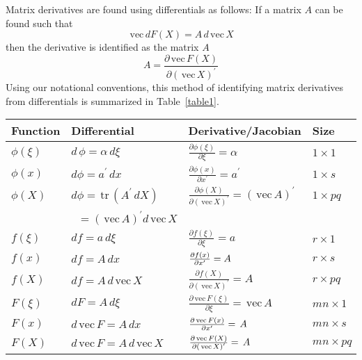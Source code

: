 \documentclass[12pt,thmsa,suthesis,verbatim]{report}
\begin{document}
Matrix derivatives are found using differentials as follows: If a matrix $A$
can be found such that 
\begin{equation}
\,\mathrm{vec}\,dF\left( X\right) =A\,d\,\mathrm{vec}\,X
\end{equation}
then the derivative is identified as the matrix $A$%
\begin{equation}
A=\frac{\partial \,\mathrm{vec}\,F\left( X\right) }{\partial \left( \,%
\mathrm{vec}\,X\right) ^{\prime }}
\end{equation}
Using our notational conventions, this method of identifying matrix
derivatives from differentials is summarized in Table~\ref{table1}\cite
{MagNeud88}.

\begin{tabular}[t]{llll}
\hline\hline
Function & Differential & Derivative/Jacobian & Size \\ \hline
$\phi \left( \xi \right) $ & $d\,\phi =\alpha \,d\xi $ & $\frac{\partial
\phi \left( \xi \right) }{\partial \xi }=\alpha $ & $1\times 1$ \\ 
$\phi \left( x\right) $ & $d\phi =a^{\prime }\,dx$ & $\frac{\partial \phi
\left( x\right) }{\partial x^{\prime }}=a^{\prime }$ & $1\times s$ \\ 
$\phi \left( X\right) $ & $d\phi =\,\mathrm{tr}\,\left( A^{\prime
}\,dX\right) $ & $\frac{\partial \phi \left( X\right) }{\partial \left( \,%
\mathrm{vec}\,X\right) ^{\prime }}=\left( \,\mathrm{vec}\,A\right) ^{\prime
} $ & $1\times pq$ \\ 
& $\;\;=\left( \,\mathrm{vec}\,A\right) ^{\prime }d\,\mathrm{vec}\,X$ &  & 
\\ 
$f\left( \xi \right) $ & $df=a\,d\xi $ & $\frac{\partial f\left( \xi \right) 
}{\partial \xi }=a$ & $r\times 1$ \\ 
$f\left( x\right) $ & $df=A\,dx$ & $\frac{\partial f\left( x\right) }{%
\partial x^{\prime }}=A$ & $r\times s$ \\ 
$f\left( X\right) $ & $df=A\,d\,\mathrm{vec}\,X$ & $\frac{\partial f\left(
X\right) }{\partial \left( \,\mathrm{vec}\,X\right) ^{\prime }}=A$ & $%
r\times pq$ \\ 
$F\left( \xi \right) $ & $dF=A\,d\xi $ & $\frac{\partial \,\mathrm{vec}%
\,F\left( \xi \right) }{\partial \xi }=\,\mathrm{vec}\,A$ & $mn\times 1$ \\ 
$F\left( x\right) $ & $d\,\mathrm{vec}\,F=A\,dx$ & $\frac{\partial \,\mathrm{%
vec}\,F\left( x\right) }{\partial x^{\prime }}=\,A$ & $mn\times s$ \\ 
$F\left( X\right) $ & $d\,\mathrm{vec}\,F=A\,d\,\mathrm{vec}\,X$ & $\frac{%
\partial \,\mathrm{vec}\,F\left( X\right) }{\partial \left( \,\mathrm{vec}%
\,X\right) ^{\prime }}=\,A$ & $mn\times pq$ \\ \hline\hline
\end{tabular}
\caption{The First Derivative Identification Table: $F$ is an  $m\times n$ matrix function,  $f$ is an $r\times 1$ vector function, $x$ is a
$s\times 1$ vector variable, $X$ is a  $p\times q$ matrix variable\label{table1}}%
\end{document}
